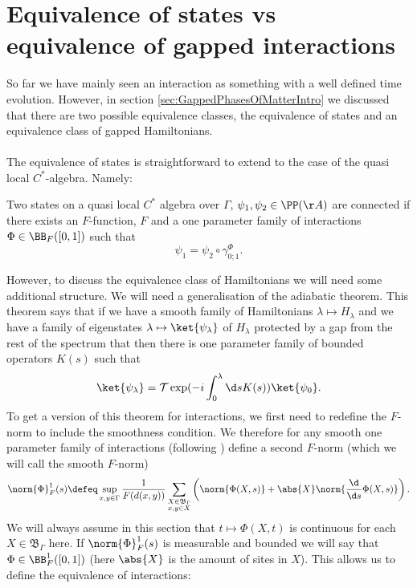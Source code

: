 \section{Equivalence of states vs equivalence of gapped interactions}
So far we have mainly seen an interaction as something with a well defined time evolution. However, in section \ref{sec:GappedPhasesOfMatterIntro} we discussed that there are two possible equivalence classes, the equivalence of states and an equivalence class of gapped Hamiltonians.
\\\\
The equivalence of states is straightforward to extend to the case of the quasi local $C^*$-algebra. Namely:
\begin{definition}\label{def:EquivalenceOfStates}
	Two states on a quasi local $C^*$ algebra over $\Gamma$, $\psi_1,\psi_2\in\PP(\AA)$ are connected if there exists an $F$-function, $F$ and a one parameter family of interactions $\Phi\in\BB_{F}([0,1])$ such that
	\begin{equation}
		\psi_1=\psi_2\circ\gamma^\Phi_{0;1}.
	\end{equation}
\end{definition}
However, to discuss the equivalence class of Hamiltonians we will need some additional structure. We will need a generalisation of the adiabatic theorem. This theorem says that if we have a smooth family of Hamiltonians $\lambda\mapsto H_\lambda$ and we have a family of eigenstates $\lambda\mapsto\ket{\psi_\lambda}$ of $H_\lambda$ protected by a gap from the rest of the spectrum that then there is one parameter family of bounded operators $K(s)$ such that
\begin{equation}
	\ket{\psi_\lambda}=\mathcal{T}\exp(-i\int_0^\lambda\d s K(s))\ket{\psi_0}.
\end{equation}
To get a version of this theorem for interactions, we first need to redefine the $F$-norm to include the smoothness condition. We therefore for any smooth one parameter family of interactions (following \cite{nachtergaele2019quasi}) define a second $F$-norm (which we will call the smooth $F$-norm)
\begin{equation}
	\norm{\Phi}_{F}^1 (s)\defeq \sup_{x,y\in \Gamma} \frac{1}{F(d(x,y))}\sum_{\substack{X\in\mathfrak{B}_\Gamma \\ x,y\in X}}\left(\norm{\Phi(X,s)}+\abs{X}\norm{\frac{\d}{\d s}\Phi(X,s)}\right).
\end{equation}
We will always assume in this section that $t\mapsto \Phi(X,t)$ is continuous for each $X\in\mathfrak{B}_\Gamma$ here. If $\norm{\Phi}_{F}^1 (s)$ is measurable and bounded we will say that $\Phi\in\BB^1_F([0,1])$ (here $\abs{X}$ is the amount of sites in $X$). This allows us to define the equivalence of interactions:
